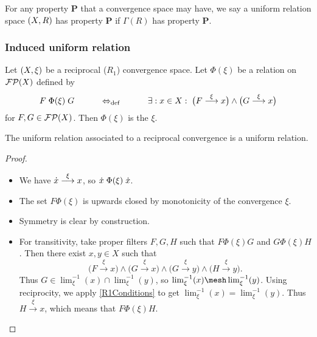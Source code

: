 \begin{definition}
For any property $\mathbf{P}$ that a convergence space may have, we say a uniform relation space $\left( X,R \right)$ has property $\mathbf{P}$ if $\Gamma(R)$ has property $\mathbf{P}$.
\end{definition}

\subsubsection{Induced uniform relation}
\begin{definition}
Let $\left( X,\xi \right)$ be a reciprocal ($R_1$) convergence space. Let $\Phi(\xi)$ be a relation on $\operatorname{\mathcal{FP}}(X)$ defined by
\[ F\mathrel{\Phi(\xi)}G \qquad\quad\Leftrightarrow_{\text{def}}\quad\qquad \exists: x\in X: \; \big(F\overset{\xi}{\longrightarrow} x\big) \land \big(G\overset{\xi}{\longrightarrow} x\big) \]
for $F,G\in\operatorname{\mathcal{FP}}(X)$.
Then $\Phi(\xi)$ is the  $\xi$.
\end{definition}

\begin{lemma} \label{uniformRelationAssociatedToR1Convergence}
The uniform relation associated to a reciprocal convergence is a uniform relation.
\end{lemma}
\begin{proof}
\begin{itemize}
\item We have $\dot{x}\overset{\xi}{\longrightarrow} x$, so $\dot{x}\mathrel{\Phi(\xi)}\dot{x}$.
\item The set $F\mathrel{\Phi(\xi)}$ is upwards closed by monotonicity of the convergence $\xi$.
\item Symmetry is clear by construction.
\item For transitivity, take proper filters $F,G,H$ such that $F\mathrel{\Phi(\xi)}G$ and $G\mathrel{\Phi(\xi)}H$. Then there exist $x,y\in X$ such that
\[ \big(F\overset{\xi}{\longrightarrow} x\big) \land \big(G\overset{\xi}{\longrightarrow} x\big) \land \big(G\overset{\xi}{\longrightarrow} y\big) \land \big(H\overset{\xi}{\longrightarrow} y\big). \]
Thus $G\in \lim^{-1}_\xi(x) \cap\lim^{-1}_\xi(y)$, so $\lim^{-1}_\xi(x) \mesh\lim^{-1}_\xi(y)$. Using reciprocity, we apply \ref{R1Conditions} to get $\lim^{-1}_\xi(x) = \lim^{-1}_\xi(y)$. Thus $H \overset{\xi}{\longrightarrow} x$, which means that $F\mathrel{\Phi(\xi)}H$.
\end{itemize}
\end{proof}

